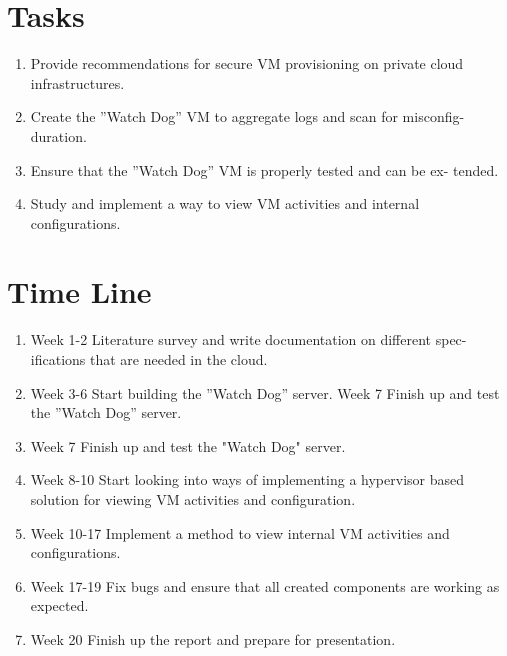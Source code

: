 \documentclass[12pt]{article}
\begin{document}
\section{Tasks}

\begin{enumerate}
    \item Provide recommendations for secure VM provisioning on private cloud infrastructures.
    \item Create the ”Watch Dog” VM to aggregate logs and scan for misconfig- duration.
    \item Ensure that the ”Watch Dog” VM is properly tested and can be ex- tended.
    \item Study and implement a way to view VM activities and internal configurations.
\end{enumerate}

\section{Time Line}
\begin{enumerate}
    \item Week 1-2 Literature survey and write documentation on different spec- ifications that are needed in the cloud.
    \item Week 3-6 Start building the ”Watch Dog” server. Week 7 Finish up and test the ”Watch Dog” server.
    \item Week 7 Finish up and test the "Watch Dog" server.
    \item Week 8-10 Start looking into ways of implementing a hypervisor based solution for viewing VM activities and configuration.
    \item Week 10-17 Implement a method to view internal VM activities and configurations.
    \item Week 17-19 Fix bugs and ensure that all created components are working as expected.
    \item Week 20 Finish up the report and prepare for presentation.
\end{enumerate}
\end{document}
